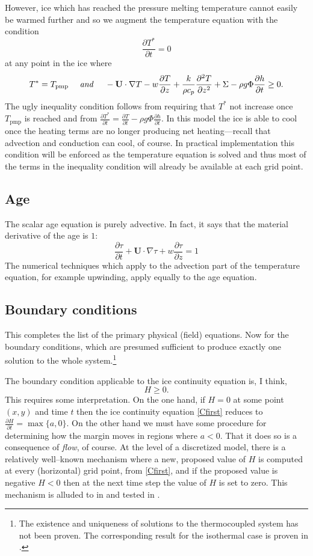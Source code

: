 \documentclass[12pt,final]{amsart}%
\theoremstyle{plain}
\theoremstyle{definition}
\theoremstyle{remark}
\newcommand{\ddt}[1]{\ensuremath{\frac{\partial #1}{\partial t}}}
\newcommand{\ddz}[1]{\ensuremath{\frac{\partial #1}{\partial z}}}
\newcommand{\dddzdz}[1]{\ensuremath{\frac{\partial^2 #1}{\partial z^2}}}
\newcommand{\grad}{\nabla}
\newcommand{\Tpmp}{T_{\text{pmp}}}
\newcommand{\bU}{{\mathbf{U}}}
\begin{document}
However, ice which has reached the pressure melting temperature cannot easily be warmed further and so we augment the temperature equation with the condition
    $$\ddt{T^*}=0$$
at any point in the ice where
    $$T^*=\Tpmp \quad \text{ \emph{and} } \quad -\bU\cdot\grad T - w \ddz{T} + \frac{k}{\rho c_p} \dddzdz{T} + \Sigma - \rho g \Phi \ddt{h} \ge 0.$$
The ugly inequality condition follows from requiring that $T^*$ not increase once $\Tpmp$ is reached and from $\ddt{T^*}=\ddt{T}-\rho g \Phi \ddt{h}$.  In this model the ice is able to cool once the heating terms are no longer producing net heating---recall that advection and conduction can cool, of course.  In practical implementation this condition will be enforced as the temperature equation is solved and thus most of the terms in the inequality condition will already be available at each grid point.


\subsection*{Age}  The scalar age equation is purely advective.  In fact, it says that the material derivative of the age is $1$:
\begin{equation}\label{ageeqn}
\ddt{\tau} + \bU\cdot \grad \tau + w \ddz{\tau} = 1
\end{equation}
The numerical techniques which apply to the advection part of the temperature equation, for example upwinding, apply equally to the age equation.


\subsection*{Boundary conditions}  This completes the list of the primary physical (field) equations.  Now for the boundary conditions, which are presumed sufficient to produce exactly one solution to the whole system.\footnote{The existence and uniqueness of solutions to the thermocoupled system has not been proven.  The corresponding result for the isothermal case is proven in \citep{CDDSV}.}

The boundary condition applicable to the ice continuity equation is, I think,
    $$H\ge 0.$$
This requires some interpretation.  On the one hand, if $H=0$ at some point $(x,y)$ and time $t$ then the ice continuity equation \eqref{Cfirst} reduces to $\ddt{H} = \max\{a,0\}$.  On the other hand we must have some procedure for determining how the margin moves in regions where $a<0$.  That it does so is a consequence of \emph{flow}, of course.  At the level of a discretized model, there is a relatively well--known mechanism where a new, proposed value of $H$ is computed at every (horizontal) grid point, from \eqref{Cfirst}, and if the proposed value is negative $H<0$ then at the next time step the value of $H$ is set to zero.  This mechanism is alluded to in \citep{vanderVeen} and tested in \citep{BLKCB}.
\end{document}
